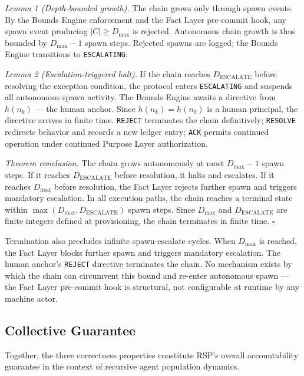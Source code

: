 \medskip
\textit{Lemma 1 (Depth-bounded growth).} The chain grows only through spawn events. By the Bounds Engine enforcement and the Fact Layer pre-commit hook, any spawn event producing $|C| \geq D_{\mathrm{max}}$ is rejected. Autonomous chain growth is thus bounded by $D_{\mathrm{max}} - 1$ spawn steps. Rejected spawns are logged; the Bounds Engine transitions to \texttt{ESCALATING}.

\medskip
\textit{Lemma 2 (Escalation-triggered halt).} If the chain reaches $D_{\mathrm{ESCALATE}}$ before resolving the exception condition, the protocol enters \texttt{ESCALATING} and suspends all autonomous spawn activity. The Bounds Engine awaits a directive from $h(n_k)$ — the human anchor. Since $h(n_k) = h(n_0)$ is a human principal, the directive arrives in finite time. \texttt{REJECT} terminates the chain definitively; \texttt{RESOLVE} redirects behavior and records a new ledger entry; \texttt{ACK} permits continued operation under continued Purpose Layer authorization.

\medskip
\textit{Theorem conclusion.} The chain grows autonomously at most $D_{\mathrm{max}} - 1$ spawn steps. If it reaches $D_{\mathrm{ESCALATE}}$ before resolution, it halts and escalates. If it reaches $D_{\mathrm{max}}$ before resolution, the Fact Layer rejects further spawn and triggers mandatory escalation. In all execution paths, the chain reaches a terminal state within $\max(D_{\mathrm{max}}, D_{\mathrm{ESCALATE}})$ spawn steps. Since $D_{\mathrm{max}}$ and $D_{\mathrm{ESCALATE}}$ are finite integers defined at provisioning, the chain terminates in finite time. $\square$

Termination also precludes infinite spawn-escalate cycles. When $D_{\mathrm{max}}$ is reached, the Fact Layer blocks further spawn and triggers mandatory escalation. The human anchor's \texttt{REJECT} directive terminates the chain. No mechanism exists by which the chain can circumvent this bound and re-enter autonomous spawn — the Fact Layer pre-commit hook is structural, not configurable at runtime by any machine actor.

\subsection{Collective Guarantee}
\label{sec:rs-collective-guarantee}

Together, the three correctness properties constitute RSP's overall accountability guarantee in the context of recursive agent population dynamics.

